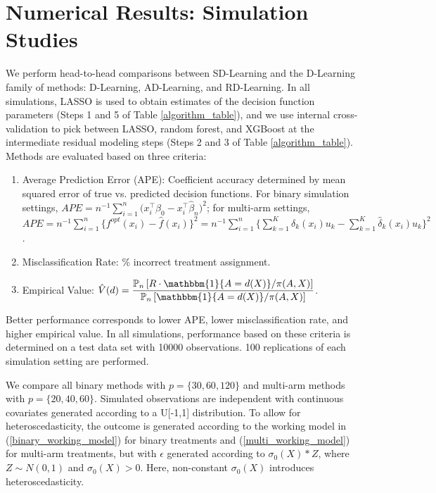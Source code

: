 \documentclass[useAMS,usenatbib]{biom}
\begin{document}
\section{Numerical Results: Simulation Studies} \label{sec_simulations}

We perform head-to-head comparisons between SD-Learning and the D-Learning family of methods: D-Learning, AD-Learning, and RD-Learning. In all simulations, LASSO is used to obtain estimates of the decision function parameters (Steps 1 and 5 of Table \ref{algorithm_table}), and we use internal cross-validation to pick between LASSO, random forest, and XGBoost at the intermediate residual modeling steps (Steps 2 and 3 of Table \ref{algorithm_table}). Methods are evaluated based on three criteria:
\begin{enumerate}
    \item Average Prediction Error (APE): Coefficient accuracy determined by mean squared error of true vs. predicted decision functions. For binary simulation settings, $APE = n^{-1} \sum_{i=1}^n \big( x_i^{\top} \beta_0 - x_i^{\top} \hat{\beta}_n \big)^2$; for multi-arm settings,  $APE = n^{-1} \sum_{i=1}^n \big\{ f^{opt}(x_i) - \hat{f}(x_i) \big\}^2 = n^{-1} \sum_{i=1}^n \big\{ \sum_{k=1}^K \delta_k(x_i)u_k - \sum_{k=1}^K \hat{\delta}_k(x_i)u_k \big\}^2$.
    \item Misclassification Rate: \% incorrect treatment assignment.
    \item Empirical Value: $\hat{V}(d) = \dfrac{\mathbb{P}_n \left[ R \cdot \mathbbm{1}\{ A=d(X) \} / \pi(A,X) \right]}{\mathbb{P}_n \left[ \mathbbm{1}\{ A=d(X)\} / \pi(A,X) \right] }$.
\end{enumerate}
Better performance corresponds to lower APE, lower misclassification rate, and higher empirical value. In all simulations, performance based on these criteria is determined on a test data set with 10000 observations. 100 replications of each simulation setting are performed.

We compare all binary methods with $p = \{ 30, 60, 120 \}$ and multi-arm methods with $p = \{ 20, 40, 60 \}$. Simulated observations are independent with continuous covariates generated according to a U[-1,1] distribution. To allow for heteroscedasticity, the outcome is generated according to the working model in (\ref{binary_working_model}) for binary treatments and (\ref{multi_working_model}) for multi-arm treatments, but with $\epsilon$ generated according to $\sigma_0(X) * Z$, where $Z \sim N(0, 1)$ and $\sigma_0(X) > 0$. Here, non-constant $\sigma_0(X)$ introduces heteroscedasticity.
\end{document}

